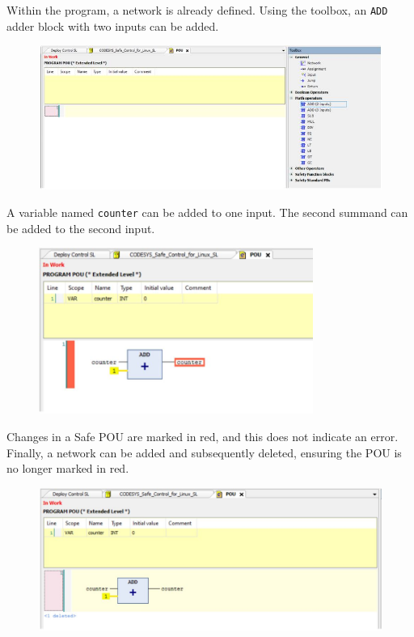 \documentclass[a4paper,12pt]{article}
\begin{document}
Within the program, a network is already defined. Using the toolbox, an \texttt{ADD} adder block with two inputs can be added.
\begin{figure}[H]
	\centering
	\includegraphics[width=1\textwidth]{e3.JPG}
\end{figure}
A variable named \texttt{counter} can be added to one input. The second summand can be added to the second input.
\begin{figure}[H]
	\centering
	\includegraphics[width=0.8\textwidth]{e4.JPG}
\end{figure}
\label{sec:safe-pou-changes}
Changes in a Safe POU are marked in red, and this does not indicate an error.
Finally, a network can be added and subsequently deleted, ensuring the POU is no longer marked in red.
\begin{figure}[H]
	\centering
	\includegraphics[width=1\textwidth]{e5.JPG}
\end{figure}
\end{document}
